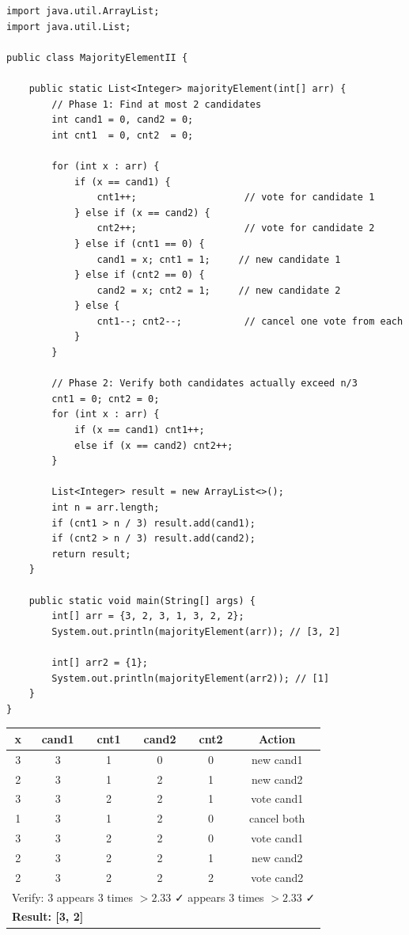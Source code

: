 \documentclass[12pt,a4paper,oneside]{book}
\begin{document}
\begin{lstlisting}[caption={Majority Element II --- Extended Boyer-Moore, O(n) time O(1) space}]
import java.util.ArrayList;
import java.util.List;

public class MajorityElementII {

    public static List<Integer> majorityElement(int[] arr) {
        // Phase 1: Find at most 2 candidates
        int cand1 = 0, cand2 = 0;
        int cnt1  = 0, cnt2  = 0;

        for (int x : arr) {
            if (x == cand1) {
                cnt1++;                   // vote for candidate 1
            } else if (x == cand2) {
                cnt2++;                   // vote for candidate 2
            } else if (cnt1 == 0) {
                cand1 = x; cnt1 = 1;     // new candidate 1
            } else if (cnt2 == 0) {
                cand2 = x; cnt2 = 1;     // new candidate 2
            } else {
                cnt1--; cnt2--;           // cancel one vote from each
            }
        }

        // Phase 2: Verify both candidates actually exceed n/3
        cnt1 = 0; cnt2 = 0;
        for (int x : arr) {
            if (x == cand1) cnt1++;
            else if (x == cand2) cnt2++;
        }

        List<Integer> result = new ArrayList<>();
        int n = arr.length;
        if (cnt1 > n / 3) result.add(cand1);
        if (cnt2 > n / 3) result.add(cand2);
        return result;
    }

    public static void main(String[] args) {
        int[] arr = {3, 2, 3, 1, 3, 2, 2};
        System.out.println(majorityElement(arr)); // [3, 2]

        int[] arr2 = {1};
        System.out.println(majorityElement(arr2)); // [1]
    }
}
\end{lstlisting}

\begin{dryrun}[arr = \{3, 2, 3, 1, 3, 2, 2\}, $n/3 = 2.33$ so threshold = 3]
\begin{center}
\begin{tabular}{cccccc}
\toprule
\textbf{x} & \textbf{cand1} & \textbf{cnt1} & \textbf{cand2} & \textbf{cnt2} & \textbf{Action}\\
\midrule
3 & 3 & 1 & 0 & 0 & new cand1\\
2 & 3 & 1 & 2 & 1 & new cand2\\
3 & 3 & 2 & 2 & 1 & vote cand1\\
1 & 3 & 1 & 2 & 0 & cancel both\\
3 & 3 & 2 & 2 & 0 & vote cand1\\
2 & 3 & 2 & 2 & 1 & new cand2\\
2 & 3 & 2 & 2 & 2 & vote cand2\\
\midrule
\multicolumn{6}{l}{Verify: 3 appears 3 times $> 2.33$ ✓ \quad 2 appears 3 times $> 2.33$ ✓}\\
\multicolumn{6}{l}{\textbf{Result: [3, 2]}}\\
\bottomrule
\end{tabular}
\end{center}
\end{dryrun}
\end{document}
